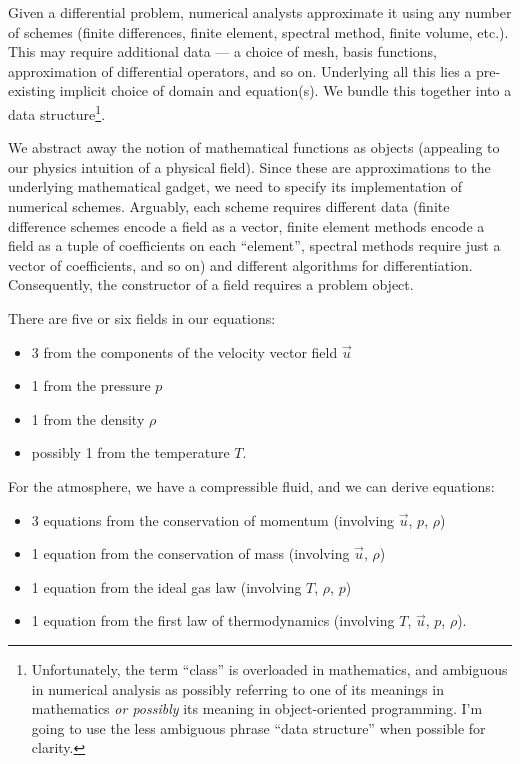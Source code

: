 Given a differential problem, numerical analysts approximate it using
any number of schemes (finite differences, finite element, spectral
method, finite volume, etc.). This may require additional data --- a
choice of mesh, basis functions, approximation of differential
operators, and so on. Underlying all this lies a pre-existing implicit
choice of domain and equation(s). We bundle this together into a
 data structure\footnote{Unfortunately, the term
``class'' is overloaded in mathematics, and ambiguous in numerical
analysis as possibly referring to one of its meanings in mathematics
\emph{or possibly} its meaning in object-oriented programming. I'm going
to use the less ambiguous phrase ``data structure'' when possible for
clarity.}.

We abstract away the notion of mathematical functions as 
objects (appealing to our physics intuition of a physical field). Since
these are approximations to the underlying mathematical gadget, we need
to specify its implementation of numerical schemes. Arguably, each
scheme requires different data (finite difference schemes encode a field
as a vector, finite element methods encode a field as a tuple of
coefficients on each ``element'', spectral methods require just a vector
of coefficients, and so on) and different algorithms for differentiation.
Consequently, the constructor of a field requires a problem object.

There are five or six fields in our equations:
\begin{itemize}
\item 3 from the components of the velocity vector field $\vec{u}$
\item 1 from the pressure $p$
\item 1 from the density $\rho$
\item possibly 1 from the temperature $T$.
\end{itemize}
For the atmosphere, we have a compressible fluid, and we can derive
equations:
\begin{itemize}
\item 3 equations from the conservation of momentum (involving
  $\vec{u}$, $p$, $\rho$)
\item 1 equation from the conservation of mass (involving $\vec{u}$, $\rho$)
\item 1 equation from the ideal gas law (involving $T$, $\rho$, $p$)
\item 1 equation from the first law of thermodynamics (involving $T$,
  $\vec{u}$, $p$, $\rho$).
\end{itemize}

